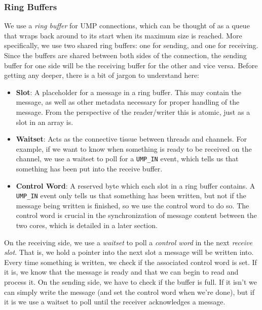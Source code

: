 \subsubsection{Ring Buffers}
We use a \textit{ring buffer} for UMP connections, which can be thought of as a queue that wraps back around to its start when its maximum size is reached. More specifically, we use two shared ring buffers: one for sending, and one for receiving. Since the buffers are shared between both sides of the connection, the sending buffer for one side will be the receiving buffer for the other and vice versa. Before getting any deeper, there is a bit of jargon to understand here:
\begin{itemize}[itemsep=0pt]
    \item \textbf{Slot}: A placeholder for a message in a ring buffer. This may contain the message, as well as other metadata necessary for proper handling of the message. From the perspective of the reader/writer this is atomic, just as a slot in an array is.
    \item \textbf{Waitset}: Acts as the connective tissue between threads and channels. For example, if we want to know when something is ready to be received on the channel, we use a waitset to poll for a \texttt{UMP\_IN} event, which tells us that something has been put into the receive buffer.
    \item \textbf{Control Word}: A reserved byte which each slot in a ring buffer contains. A \texttt{UMP\_IN} event only tells us that something has been written, but not if the message being written is finished, so we use the control word to do so. The control word is crucial in the synchronization of message content between the two cores, which is detailed in a later section.
\end{itemize}
On the receiving side, we use a \textit{waitset} to poll a \textit{control word} in the next \textit{receive slot}. That is, we hold a pointer into the next slot a message will be written into. Every time something is written, we check if the associated control word is set. If it is, we know that the message is ready and that we can begin to read and process it. On the sending side, we have to check if the buffer is full. If it isn't we can simply write the message (and set the control word when we're done), but if it is we use a waitset to poll until the receiver acknowledges a message.

